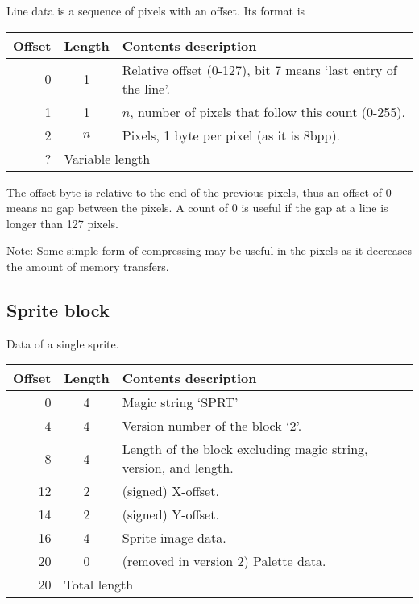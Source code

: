 \documentclass{article}
\begin{document}
Line data is a sequence of pixels with an offset. Its format is

\begin{center}
\begin{tabular}{|r|c|l|} \hline
\textbf{Offset} & \textbf{Length} & \textbf{Contents description} \\ \hline
 0 & 1 & Relative offset (0-127), bit 7 means `last entry of the line'. \\
 1 & 1 & $n$, number of pixels that follow this count (0-255). \\
 2 & $n$ & Pixels, 1 byte per pixel (as it is 8bpp). \\ \hline
 ? & \multicolumn{2}{l|}{Variable length} \\ \hline
\end{tabular}
\end{center}

The offset byte is relative to the end of the previous pixels, thus an offset
of 0 means no gap between the pixels. A count of 0 is useful if the gap at a
line is longer than 127 pixels.

\medskip
Note: Some simple form of compressing may be useful in the pixels as it
decreases the amount of memory transfers.


\subsection{Sprite block}
Data of a single sprite.

\begin{center}
\begin{tabular}{|r|c|l|} \hline
\textbf{Offset} & \textbf{Length} & \textbf{Contents description} \\ \hline
   0 &  4 & Magic string `SPRT' \\
   4 &  4 & Version number of the block `2'. \\
   8 &  4 & Length of the block excluding magic string, version, and length. \\
  12 &  2 & (signed) X-offset. \\
  14 &  2 & (signed) Y-offset. \\
  16 &  4 & Sprite image data. \\
  20 &  0 & (removed in version 2) Palette data. \\ \hline
  20 & \multicolumn{2}{l|}{Total length} \\ \hline
\end{tabular}
\end{center}
\end{document}
